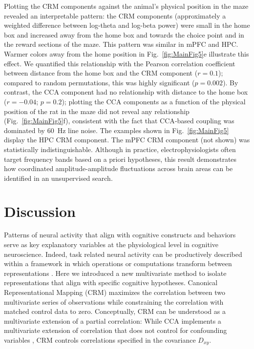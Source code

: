 \documentclass{article}
\begin{document}
Plotting the CRM components against the animal's physical position in the maze revealed an interpretable pattern: the CRM components (approximately a weighted difference between log-theta and log-beta power) were small in the home box and increased away from the home box and towards the choice point and in the reward sections of the maze. This pattern was similar in mPFC and HPC. Warmer colors away from the home position in Fig.~\ref{fig:MainFig5}e illustrate this effect. We quantified this relationship with the Pearson correlation coefficient between distance from the home box and the CRM component ($r=0.1$); compared to random permutations, this was highly significant ($p=0.002$). By contrast, the CCA component had no relationship with distance to the home box ($r=-0.04$; $p=0.2$); plotting the CCA components as a function of the physical position of the rat in the maze did not reveal any relationship (Fig.~\ref{fig:MainFig5}f), consistent with the fact that CCA‑based coupling was dominated by 60~Hz line noise. The examples shown in Fig.~\ref{fig:MainFig5} display the HPC CRM component. The mPFC CRM component (not shown) was statistically indistinguishable. Although in practice, electrophysiologists often target frequency bands based on a priori hypotheses\cite{rosenblumChoiceBehaviorsPrefrontal2025a}, this result demonstrates how coordinated amplitude-amplitude fluctuations across brain areas can be identified in an unsupervised search.

%
\section*{Discussion}\label{sec:Discussion}
%
Patterns of neural activity that align with cognitive constructs and behaviors serve as key explanatory variables at the physiological level in cognitive neuroscience. Indeed, task related neural activity can be productively described within a framework in which operations or computations transform between representations \cite{pohlClarifyingConceptualDimensions2025, fodorRepresentationsPhilosophicalEssays1981, marr_vision_1982}. Here we introduced a new multivariate method to isolate representations that align with specific cognitive hypotheses. Canonical Representational Mapping (CRM) maximizes the correlation between two multivariate series of observations while constraining the correlation with matched control data to zero. Conceptually, CRM can be understood as a multivariate extension of a partial correlation: While CCA implements a multivariate extension of correlation that does not control for confounding variables \cite{tuzhilinaCanonicalCorrelationAnalysis2023}, CRM controls correlations specified in the covariance $D_{xy}$.
\end{document}
